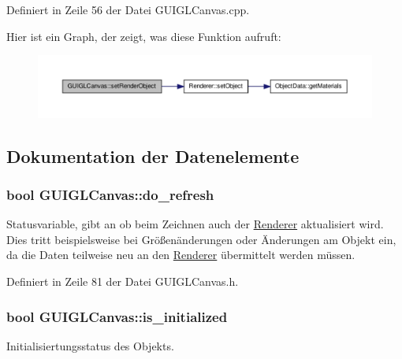 Definiert in Zeile 56 der Datei G\-U\-I\-G\-L\-Canvas.\-cpp.



Hier ist ein Graph, der zeigt, was diese Funktion aufruft\-:\nopagebreak
\begin{figure}[H]
\begin{center}
\leavevmode
\includegraphics[width=350pt]{classGUIGLCanvas_a643f11a7ef05829a6c48d037ad2c4b9b_cgraph}
\end{center}
\end{figure}




\subsection{Dokumentation der Datenelemente}
\hypertarget{classGUIGLCanvas_a7139f37aa028f71e393a0c479299455d}{
\subsubsection[{do\-\_\-refresh}]{\setlength{\rightskip}{0pt plus 5cm}bool G\-U\-I\-G\-L\-Canvas\-::do\-\_\-refresh\hspace{0.3cm}{\ttfamily [private]}}}\label{classGUIGLCanvas_a7139f37aa028f71e393a0c479299455d}
Statusvariable, gibt an ob beim Zeichnen auch der \hyperlink{classRenderer}{Renderer} aktualisiert wird. Dies tritt beispielsweise bei Größenänderungen oder Änderungen am Objekt ein, da die Daten teilweise neu an den \hyperlink{classRenderer}{Renderer} übermittelt werden müssen. 

Definiert in Zeile 81 der Datei G\-U\-I\-G\-L\-Canvas.\-h.

\hypertarget{classGUIGLCanvas_a59e01564652765dec69e7097c10b4455}{
\subsubsection[{is\-\_\-initialized}]{\setlength{\rightskip}{0pt plus 5cm}bool G\-U\-I\-G\-L\-Canvas\-::is\-\_\-initialized\hspace{0.3cm}{\ttfamily [private]}}}\label{classGUIGLCanvas_a59e01564652765dec69e7097c10b4455}
Initialisiertungsstatus des Objekts. 

